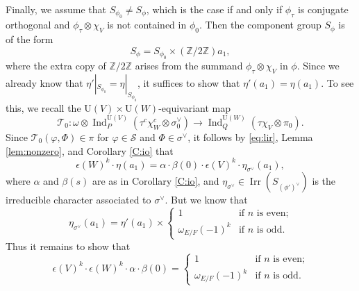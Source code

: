\documentclass[11pt]{amsart}
\numberwithin{equation}{section}
\theoremstyle{plain}
\theoremstyle{definition}
\theoremstyle{remark}
\def\Ind{\operatorname{Ind}}
\def\Irr{\operatorname{Irr}}
\def\U{\mathrm{U}}
\def\ZZ{\mathbb{Z}}
\def\T{\mathcal{T}}
\def\s{\mathscr{S}}
\begin{document}
Finally, we assume that $S_{\phi_0} \ne S_{\phi}$, which is the case if and only if $\phi_\tau$ is conjugate orthogonal and $\phi_\tau \otimes \chi_V$ is not contained in $\phi_0$.
Then the component group $S_{\phi}$ is of the form
\[
 S_{\phi} = S_{\phi_0} \times (\ZZ /2 \ZZ) a_1, 
\]
where the extra copy of $\ZZ / 2 \ZZ$ arises from the summand $\phi_\tau \otimes \chi_V$ in $\phi$.
Since we already know that $\eta'|_{S_{\phi_0}} = \eta|_{S_{\phi_0}}$, it suffices to show that $\eta'(a_1) = \eta(a_1)$.
To see this, we recall the $\U(V) \times \U(W)$-equivariant map
\[
 \T_0 : \omega \otimes \Ind^{\U(V)}_P(\tau^c \chi_W^c \otimes \sigma_0^\vee)
 \longrightarrow \Ind^{\U(W)}_Q(\tau \chi_V \otimes \pi_0).
\]
Since $\T_0(\varphi, \Phi) \in \pi$ for $\varphi \in \s$ and $\Phi \in \sigma^\vee$, it follows by \eqref{eq:lir}, Lemma \ref{lem:nonzero}, and Corollary \ref{C:io} that
\[
 \epsilon(W)^k \cdot \eta(a_1)
 = \alpha \cdot \beta(0) \cdot \epsilon(V)^k \cdot \eta_{\sigma^\vee}(a_1),
\]
where $\alpha$ and $\beta(s)$ are as in Corollary \ref{C:io}, 
and $\eta_{\sigma^\vee} \in \Irr(S_{(\phi')^\vee})$ is the irreducible character associated to $\sigma^\vee$.
But we know that
\[
 \eta_{\sigma^\vee}(a_1) = \eta'(a_1)
 \times 
 \begin{cases}
  1 & \text{if $n$ is even;} \\
  \omega_{E/F}(-1)^k & \text{if $n$ is odd.}
 \end{cases}
\]
Thus it remains to show that
\[
 \epsilon(V)^k \cdot \epsilon(W)^k \cdot \alpha \cdot \beta(0) = 
 \begin{cases}
  1 & \text{if $n$ is even;} \\
  \omega_{E/F}(-1)^k & \text{if $n$ is odd.}
 \end{cases}
\]
\end{document}
